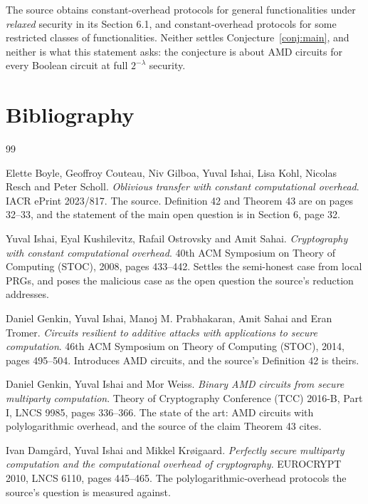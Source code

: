 \documentclass{aicr-conjecture}
\begin{document}
\begin{remark}
The source obtains constant-overhead protocols for general
functionalities under \emph{relaxed} security in its Section 6.1, and
constant-overhead protocols for some restricted classes of
functionalities. Neither settles Conjecture~\ref{conj:main}, and neither
is what this statement asks: the conjecture is about AMD circuits for
every Boolean circuit at full $2^{-\lambda}$ security.
\end{remark}

\section{Bibliography}

\begin{aicrbibliography}{99}

Elette Boyle, Geoffroy Couteau, Niv Gilboa, Yuval Ishai, Lisa Kohl,
Nicolas Resch and Peter Scholl.
\emph{Oblivious transfer with constant computational overhead}.
IACR ePrint 2023/817.
The source. Definition 42 and Theorem 43 are on pages 32--33, and the
statement of the main open question is in Section 6, page 32.

Yuval Ishai, Eyal Kushilevitz, Rafail Ostrovsky and Amit Sahai.
\emph{Cryptography with constant computational overhead}.
40th ACM Symposium on Theory of Computing (STOC), 2008, pages 433--442.
Settles the semi-honest case from local PRGs, and poses the malicious
case as the open question the source's reduction addresses.

Daniel Genkin, Yuval Ishai, Manoj M. Prabhakaran, Amit Sahai and Eran
Tromer.
\emph{Circuits resilient to additive attacks with applications to secure
computation}.
46th ACM Symposium on Theory of Computing (STOC), 2014, pages
495--504.
Introduces AMD circuits, and the source's Definition 42 is theirs.

Daniel Genkin, Yuval Ishai and Mor Weiss.
\emph{Binary AMD circuits from secure multiparty computation}.
Theory of Cryptography Conference (TCC) 2016-B, Part I, LNCS 9985, pages
336--366.
The state of the art: AMD circuits with polylogarithmic overhead, and the
source of the claim Theorem 43 cites.

Ivan Damg\aa{}rd, Yuval Ishai and Mikkel Kr\o{}igaard.
\emph{Perfectly secure multiparty computation and the computational
overhead of cryptography}.
EUROCRYPT 2010, LNCS 6110, pages 445--465.
The polylogarithmic-overhead protocols the source's question is measured
against.


\end{aicrbibliography}
\end{document}
